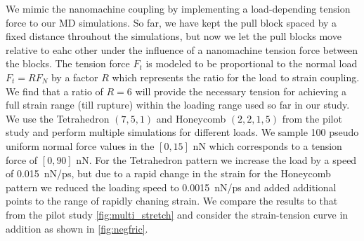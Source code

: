We mimic the nanomachine coupling by implementing a load-depending tension force to our \acrshort{MD} simulations. So far, we have kept the pull block spaced by a fixed distance throuhout the simulations, but now we let the pull blocks move relative to eahc other under the influence of a nanomachine tension force between the blocks. The tension force $F_t$ is modeled to be proportional to the normal load $F_t = RF_N$ by a factor $R$ which represents the ratio for the load to strain coupling. We find that a ratio of
$R=6$ will provide the necessary tension for achieving a full strain range (till rupture) within the loading range used so far in our study. We use the Tetrahedron
$(7,5,1)$ and Honeycomb $(2,2,1,5)$ from the pilot study and perform multiple
simulations for different loads. We sample 100 pseudo uniform normal force
values in the $[0, 15]$ nN which corresponds to a tension force of $[0, 90]$ nN. For the Tetrahedron pattern we increase the load by a speed of \SI{0.015}{nN/ps}, but due to a rapid change in the strain for the Honeycomb pattern we reduced the loading speed to \SI{0.0015}{nN/ps} and added additional points to the range of rapidly chaning strain. We compare the results to that from the pilot study \cref{fig:multi_stretch} and consider the strain-tension curve in addition as shown in \cref{fig:negfric}.







